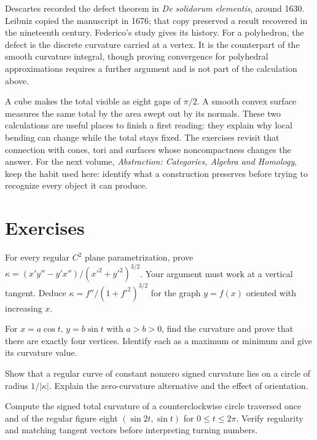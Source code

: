 Descartes recorded the defect theorem in \emph{De solidorum elementis}, around 1630. Leibniz copied the manuscript in 1676; that copy preserved a result recovered in the nineteenth century. Federico's study gives its history. For a polyhedron, the defect is the discrete curvature carried at a vertex. It is the counterpart of the smooth curvature integral, though proving convergence for polyhedral approximations requires a further argument and is not part of the calculation above.

A cube makes the total visible as eight gaps of $\pi/2$. A smooth convex surface measures the same total by the area swept out by its normals. These two calculations are useful places to finish a first reading: they explain why local bending can change while the total stays fixed. The exercises revisit that connection with cones, tori and surfaces whose noncompactness changes the answer. For the next volume, \emph{Abstraction: Categories, Algebra and Homology}, keep the habit used here: identify what a construction preserves before trying to recognize every object it can produce.

\section{Exercises}

\begin{exercise}[$\star$]\label{geometry:ex:graphcurv}
For every regular $C^2$ plane parametrization, prove
$\kappa=(x'y''-y'x'')/(x'^2+y'^2)^{3/2}$. Your argument must work at a vertical tangent. Deduce $\kappa=f''/(1+f'^2)^{3/2}$ for the graph $y=f(x)$ oriented with increasing $x$.
\end{exercise}

\begin{exercise}[$\star$]\label{geometry:ex:ellipsevertex}
For $x=a\cos t$, $y=b\sin t$ with $a>b>0$, find the curvature and prove that there are exactly four vertices. Identify each as a maximum or minimum and give its curvature value.
\end{exercise}

\begin{exercise}[$\star$]\label{geometry:ex:constcurv}
Show that a regular curve of constant nonzero signed curvature lies on a circle of radius $1/|\kappa|$. Explain the zero-curvature alternative and the effect of orientation.
\end{exercise}

\begin{exercise}[$\star$]\label{geometry:ex:totalcurv}
Compute the signed total curvature of a counterclockwise circle traversed once and of the regular figure eight $(\sin2t,\sin t)$ for $0\le t\le2\pi$. Verify regularity and matching tangent vectors before interpreting turning numbers.
\end{exercise}

